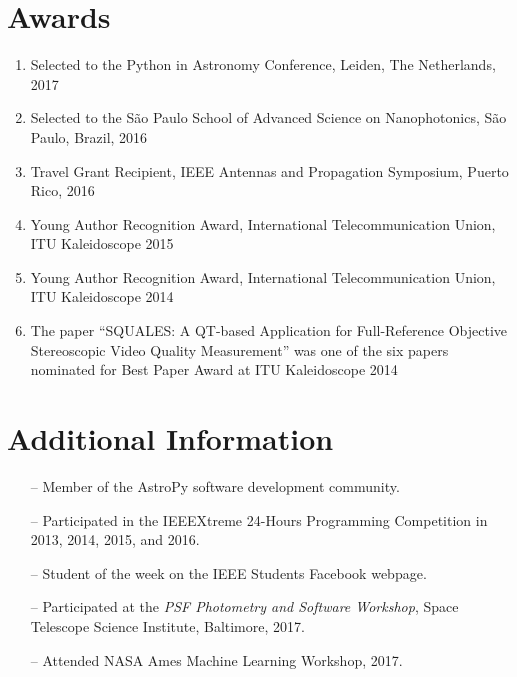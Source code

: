 \documentclass[10pt]{article}
\begin{document}
\begin{titlepage}
\section*{Awards}
\begin{enumerate}
  \item Selected to the Python in Astronomy Conference, Leiden, The Netherlands, 2017
  \item Selected to the S\~ao Paulo School of Advanced Science on Nanophotonics, S\~ao Paulo, Brazil, 2016
  \item Travel Grant Recipient, IEEE Antennas and Propagation Symposium, Puerto Rico, 2016
  \item Young Author Recognition Award, International Telecommunication Union, ITU Kaleidoscope 2015
  \item Young Author Recognition Award, International Telecommunication Union, ITU Kaleidoscope 2014
  \item The paper ``SQUALES: A QT-based Application for Full-Reference Objective Stereoscopic Video Quality Measurement'' was one of the six papers nominated for Best Paper Award at ITU Kaleidoscope 2014
\end{enumerate}

\section*{Additional Information}
\begin{itemize}
    \item[--] Member of the AstroPy software development community.
    \item[--] Participated in the IEEEXtreme 24-Hours Programming Competition in 2013, 2014, 2015, and 2016.
    \item[--] Student of the week on the IEEE Students Facebook webpage.
    \item[--] Participated at the \textit{PSF Photometry and Software Workshop}, Space Telescope Science Institute, Baltimore, 2017.
    \item[--] Attended NASA Ames Machine Learning Workshop, 2017.
\end{itemize}

\end{titlepage}
\end{document}
